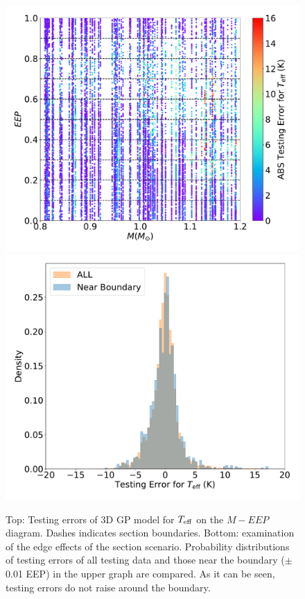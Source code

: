  \begin{figure}
	\includegraphics[width=1.0\columnwidth]{3d-testing_teff-10sections.pdf}
	\includegraphics[width=1.0\columnwidth]{3d-testing_teff-hist-10sections.pdf}	
    \caption{Top: Testing errors of 3D GP model for $T_{\rm eff}$ on the $M - EEP$ diagram. Dashes indicates section boundaries. Bottom: examination of the edge effects of the section scenario. Probability distributions of testing errors of all testing data and those near the boundary ($\pm$0.01 EEP) in the upper graph are compared.  As it can be seen, testing errors do not raise around the boundary. }  
    \label{fig:3dtest}
\end{figure}

